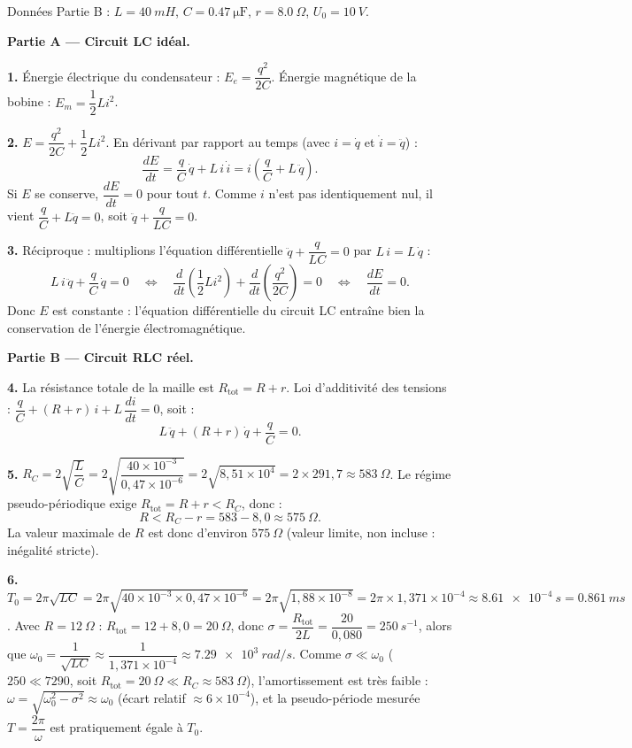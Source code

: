 \documentclass[11pt]{article}
\begin{document}
\begin{corrige}
Données Partie B : $L = \SI{40}{mH}$, $C = \SI{0,47}{\micro\farad}$, $r = \SI{8,0}{\Omega}$, $U_0 = \SI{10}{V}$.

\textbf{Partie A — Circuit LC idéal.}

\textbf{1.} Énergie électrique du condensateur : $E_e = \dfrac{q^2}{2C}$. Énergie magnétique de la bobine : $E_m = \dfrac{1}{2}Li^2$.

\textbf{2.} $E = \dfrac{q^2}{2C} + \dfrac{1}{2}Li^2$. En dérivant par rapport au temps (avec $i = \dot{q}$ et $\dot{i} = \ddot{q}$) :
\[
\frac{dE}{dt} = \frac{q}{C}\,\dot{q} + L\,i\,\dot{i} = i\left(\frac{q}{C} + L\,\ddot{q}\right).
\]
Si $E$ se conserve, $\dfrac{dE}{dt} = 0$ pour tout $t$. Comme $i$ n'est pas identiquement nul, il vient $\dfrac{q}{C} + L\ddot{q} = 0$, soit $\boxed{\ddot{q} + \dfrac{q}{LC} = 0}$.

\textbf{3.} Réciproque : multiplions l'équation différentielle $\ddot{q} + \dfrac{q}{LC} = 0$ par $L\,i = L\,\dot{q}$ :
\[
L\,i\,\ddot{q} + \frac{q}{C}\,\dot{q} = 0
\quad\Longleftrightarrow\quad
\frac{d}{dt}\!\left(\frac{1}{2}Li^2\right) + \frac{d}{dt}\!\left(\frac{q^2}{2C}\right) = 0
\quad\Longleftrightarrow\quad
\frac{dE}{dt} = 0.
\]
Donc $E$ est constante : l'équation différentielle du circuit LC entraîne bien la conservation de l'énergie électromagnétique.

\textbf{Partie B — Circuit RLC réel.}

\textbf{4.} La résistance totale de la maille est $R_{\text{tot}} = R + r$. Loi d'additivité des tensions : $\dfrac{q}{C} + (R + r)\,i + L\,\dfrac{di}{dt} = 0$, soit :
\[
\boxed{L\,\ddot{q} + (R + r)\,\dot{q} + \frac{q}{C} = 0}.
\]

\textbf{5.} $R_C = 2\sqrt{\dfrac{L}{C}} = 2\sqrt{\dfrac{40\times10^{-3}}{0,47\times10^{-6}}} = 2\sqrt{8,51\times10^{4}} = 2 \times 291,7 \approx \SI{583}{\Omega}$.
Le régime pseudo-périodique exige $R_{\text{tot}} = R + r < R_C$, donc :
\[
R < R_C - r = 583 - 8,0 \approx \SI{575}{\Omega}.
\]
La valeur maximale de $R$ est donc d'environ $\SI{575}{\Omega}$ (valeur limite, non incluse : inégalité stricte).

\textbf{6.} $T_0 = 2\pi\sqrt{LC} = 2\pi\sqrt{40\times10^{-3} \times 0,47\times10^{-6}} = 2\pi\sqrt{1,88\times10^{-8}} = 2\pi \times 1,371\times10^{-4} \approx \SI{8,61e-4}{s} = \SI{0,861}{ms}$.
Avec $R = \SI{12}{\Omega}$ : $R_{\text{tot}} = 12 + 8,0 = \SI{20}{\Omega}$, donc $\sigma = \dfrac{R_{\text{tot}}}{2L} = \dfrac{20}{0,080} = \SI{250}{s^{-1}}$, alors que $\omega_0 = \dfrac{1}{\sqrt{LC}} \approx \dfrac{1}{1,371\times10^{-4}} \approx \SI{7,29e3}{rad/s}$.
Comme $\sigma \ll \omega_0$ ($250 \ll 7290$, soit $R_{\text{tot}} = \SI{20}{\Omega} \ll R_C \approx \SI{583}{\Omega}$), l'amortissement est très faible : $\omega = \sqrt{\omega_0^2 - \sigma^2} \approx \omega_0$ (écart relatif $\approx 6\times10^{-4}$), et la pseudo-période mesurée $T = \dfrac{2\pi}{\omega}$ est pratiquement égale à $T_0$.


\end{corrige}
\end{document}
